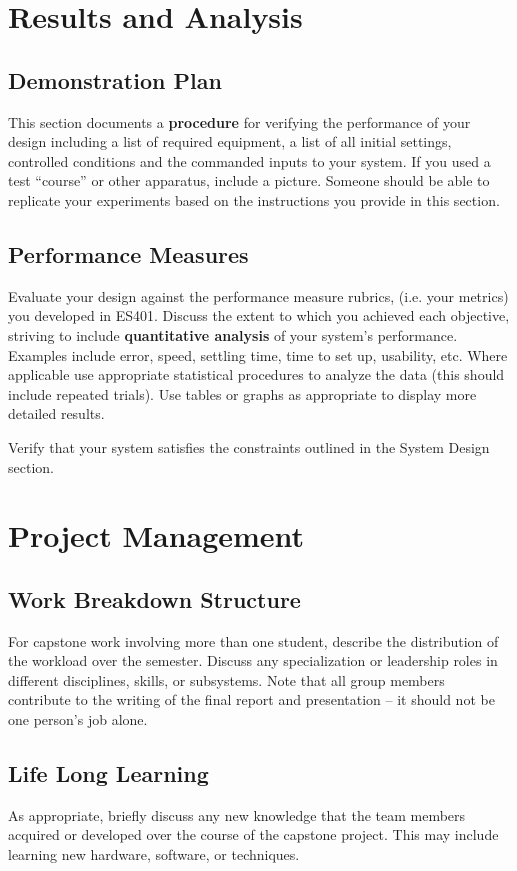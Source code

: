 \documentclass{wsecapstone}
\begin{document}
\section{Results and Analysis}

\subsection{Demonstration Plan}
This section documents a \textbf{procedure} for verifying the performance of your design including a list of required equipment, a list of all initial settings, controlled conditions and the commanded inputs to your system. If you used a test “course” or other apparatus, include a picture.  Someone should be able to replicate your experiments based on the instructions you provide in this section.  

\subsection{Performance Measures}
Evaluate your design against the performance measure rubrics, (i.e. your metrics) you developed in ES401. Discuss the extent to which you achieved each objective, striving to include \textbf{quantitative analysis} of your system’s performance. Examples include error, speed, settling time, time to set up, usability, etc. Where applicable use appropriate statistical procedures to analyze the data (this should include repeated trials). Use tables or graphs as appropriate to display more detailed results.  

Verify that your system satisfies the constraints outlined in the System Design section.




\section{Project Management}

\subsection{Work Breakdown Structure}
For capstone work involving more than one student, describe the distribution of the workload over the semester. Discuss any specialization or leadership roles in different disciplines, skills, or subsystems. Note that all group members contribute to the writing of the final report and presentation – it should not be one person’s job alone.  

\subsection{Life Long Learning}
As appropriate, briefly discuss any new knowledge that the team members acquired or developed over the course of the capstone project. This may include learning new hardware, software, or techniques.
\end{document}
